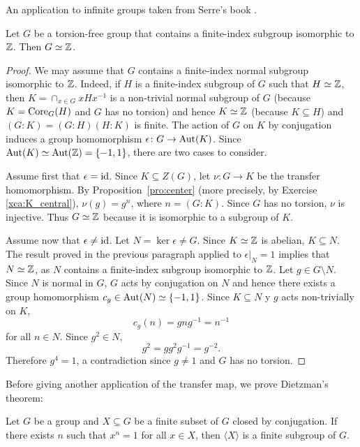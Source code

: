 An application to infinite groups taken from Serre's book 
\cite[7.12]{MR3469786}. 

\begin{theorem}
	Let $G$ be a torsion-free group that contains a finite-index subgroup isomorphic to  
	$\mathbb{Z}$. Then $G\simeq\mathbb{Z}$.
\end{theorem}

\begin{proof}
	We may assume that $G$ contains a finite-index normal subgroup isomorphic to $\mathbb{Z}$. Indeed, 
	if $H$ is a finite-index subgroup of $G$ such that $H\simeq\mathbb{Z}$, then 
	$K=\cap_{x\in G}xHx^{-1}$ is a non-trivial normal subgroup of $G$ (because $K=\operatorname{Core}_G(H)$ and 
	$G$ has no torsion) and hence $K\simeq\mathbb{Z}$ (because  
	$K\subseteq H$) and $(G:K)=(G:H)(H:K)$ is finite.
	The action of $G$ on $K$ by conjugation induces a group homomorphism  
	$\epsilon\colon G\to\operatorname{Aut}(K)$. Since $\operatorname{Aut}(K)\simeq\operatorname{Aut}(\mathbb{Z})=\{-1,1\}$, 
	there are two cases to consider.
	
	Assume first that $\epsilon=\operatorname{id}$. Since $K\subseteq Z(G)$, let
	$\nu\colon G\to K$ be the transfer homomorphism. By
	Proposition~\ref{pro:center} (more precisely, 
	by Exercise \ref{xca:K_central}), $\nu(g)=g^n$, where $n=(G:K)$. Since
	$G$ has no torsion, $\nu$ is injective. Thus
	$G\simeq\mathbb{Z}$ because it is isomorphic to a subgroup of $K$.

	Assume now that $\epsilon\ne\operatorname{id}$. Let $N=\ker\epsilon\ne G$. Since
	$K\simeq\mathbb{Z}$ is abelian, $K\subseteq N$. The result proved in the previous paragraph 
	applied to $\epsilon|_N=1$ implies that $N\simeq\mathbb{Z}$, as 
	$N$ contains a finite-index subgroup isomorphic to $\mathbb{Z}$. Let $g\in G\setminus N$. 
	Since $N$ is normal in $G$, $G$ acts by conjugation on $N$ and hence 
	there exists a group homomorphism $c_g\in\operatorname{Aut}(N)\simeq\{-1,1\}$. Since
	$K\subseteq N$ y $g$ acts non-trivially on $K$, 
	\[
	c_g(n)=gng^{-1}=n^{-1}
	\]
	for all $n\in N$.  Since 
	$g^2\in N$, 
	\[
		g^2=gg^2g^{-1}=g^{-2}.
	\]
	Therefore $g^4=1$, a contradiction since $g\ne1$ and $G$ has no torsion.
\end{proof}

Before giving another application of the transfer map, we 
prove Dietzman's theorem: 

\begin{theorem}[Dietzmann]
	\label{theorem:Dietzmann} 
	Let $G$ be a group and $X\subseteq G$ be a finite subset of $G$ closed by
	conjugation. If there exists $n$ such that $x^n=1$ for all $x\in X$, then
	$\langle X\rangle$ is a finite subgroup of $G$.
\end{theorem}

